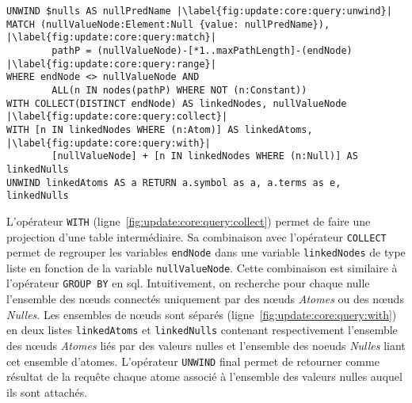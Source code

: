 \begin{lstlisting}[name=qcore, language=cypher, caption=Requête Cypher pour calculer l'ensemble $\textsf{LinkedNull}_{\mathcal{D}}$, label={fig:update:core:query}, escapechar=|, float, floatplacement=htb]
UNWIND $nulls AS nullPredName |\label{fig:update:core:query:unwind}|
MATCH (nullValueNode:Element:Null {value: nullPredName}), |\label{fig:update:core:query:match}|
		pathP = (nullValueNode)-[*1..maxPathLength]-(endNode) |\label{fig:update:core:query:range}|
WHERE endNode <> nullValueNode AND
		ALL(n IN nodes(pathP) WHERE NOT (n:Constant))
WITH COLLECT(DISTINCT endNode) AS linkedNodes, nullValueNode |\label{fig:update:core:query:collect}|
WITH [n IN linkedNodes WHERE (n:Atom)] AS linkedAtoms, |\label{fig:update:core:query:with}|
		[nullValueNode] + [n IN linkedNodes WHERE (n:Null)] AS linkedNulls
UNWIND linkedAtoms AS a RETURN a.symbol as a, a.terms as e, linkedNulls
\end{lstlisting}

L'opérateur \verb|WITH| (ligne~\ref{fig:update:core:query:collect}) permet de faire une projection d'une table intermédiaire.
Sa combinaison avec l'opérateur \verb|COLLECT| permet de regrouper les variables \verb|endNode| dans une variable \verb|linkedNodes| de type liste en fonction de la variable \verb|nullValueNode|.
Cette combinaison est similaire à l'opérateur \verb|GROUP BY| en \gls{sql}.
Intuitivement, on recherche pour chaque nulle l'ensemble des nœuds connectés uniquement par des nœuds \textit{Atomes} ou des nœuds \textit{Nulles}.
Les ensembles de nœuds sont séparés (ligne~\ref{fig:update:core:query:with}) en deux listes \verb|linkedAtoms| et \verb|linkedNulls| contenant respectivement l'ensemble des nœuds \textit{Atomes} liés par des valeurs nulles et l'ensemble des noeuds \textit{Nulles} liant cet ensemble d'atomes.
L'opérateur \verb|UNWIND| final permet de retourner comme résultat de la requête chaque atome associé à l'ensemble des valeurs nulles auquel ils sont attachés.

